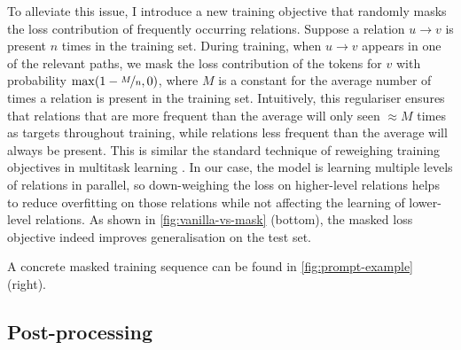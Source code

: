 

To alleviate this issue, I introduce a new training objective that randomly masks the loss contribution of frequently occurring relations. Suppose a relation $u \to v$ is present $n$ times in the training set. During training, when $u \to v$ appears in one of the relevant paths, we mask the loss contribution of the tokens for $v$ with probability $\max(1 - \nicefrac{M}{n}, 0)$, where $M$ is a constant for the average number of times a relation is present in the training set. Intuitively, this regulariser ensures that relations that are more frequent than the average will only seen $\approx\!M$ times as targets throughout training, while relations less frequent than the average will always be present. This is similar the standard technique of reweighing training objectives in multitask learning \cite{caruana1997multitask}. In our case, the model is learning multiple levels of relations in parallel, so down-weighing the loss on higher-level relations helps to reduce overfitting on those relations while not affecting the learning of lower-level relations. As shown in \cref{fig:vanilla-vs-mask} (bottom), the masked loss objective indeed improves generalisation on the test set.

A concrete masked training sequence can be found in \cref{fig:prompt-example} (right).

\subsection{Post-processing}  \label{sec:method:post-processing}

